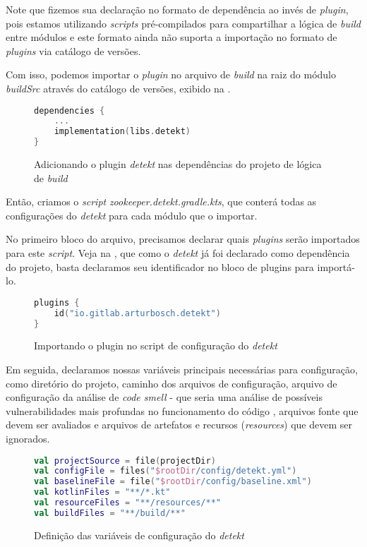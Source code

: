 Note que fizemos sua declaração no formato de dependência ao invés de \textit{plugin}, pois estamos utilizando \textit{scripts} pré-compilados para compartilhar a lógica de \textit{build} entre módulos e este formato ainda não suporta a importação no formato de \textit{plugins} via catálogo de versões.

Com isso, podemos importar o \textit{plugin} no arquivo de \textit{build} na raiz do módulo \textit{buildSrc} através do catálogo de versões, exibido na .

\begin{figure}[H]
    \begin{lstlisting}[language=Kotlin,numbers = none]
dependencies {
    ...
    implementation(libs.detekt)
}
    \end{lstlisting}   
    \caption{Adicionando o plugin \textit{detekt} nas dependências do projeto de lógica de \textit{build}}
    \label{fig:add_plugin_as_dependency}
\end{figure}

Então, criamos o \textit{script} \textit{zookeeper.detekt.gradle.kts}, que conterá todas as configurações do \textit{detekt} para cada módulo que o importar. 

No primeiro bloco do arquivo, precisamos declarar quais \textit{plugins} serão importados para este \textit{script}. Veja na , que como o \textit{detekt} já foi declarado como dependência do projeto, basta declaramos seu identificador no bloco de plugins para importá-lo.

\begin{figure}[H]
    \begin{lstlisting}[language=Kotlin,numbers = none]
plugins {
    id("io.gitlab.arturbosch.detekt")
}
    \end{lstlisting}
    \caption{Importando o plugin no script de configuração do \textit{detekt}}
    \label{fig:add_plugin_script}
\end{figure}

Em seguida, declaramos nossas variáveis principais necessárias para configuração, como diretório do projeto, caminho dos arquivos de configuração, arquivo de configuração da análise de \textit{code smell} - que seria uma análise de possíveis vulnerabilidades mais profundas no funcionamento do código \cite{coodesh_code_smell}, arquivos fonte que devem ser avaliados e arquivos de artefatos e recursos (\textit{resources}) que devem ser ignorados.

\begin{figure}[H]
    \begin{lstlisting}[language=Kotlin,numbers = none]
val projectSource = file(projectDir)
val configFile = files("$rootDir/config/detekt.yml")
val baselineFile = file("$rootDir/config/baseline.xml")
val kotlinFiles = "**/*.kt"
val resourceFiles = "**/resources/**"
val buildFiles = "**/build/**"
    \end{lstlisting}
    \caption{Definição das variáveis de configuração do \textit{detekt}}
    \label{fig:add_config_variables_on_script}
\end{figure}


